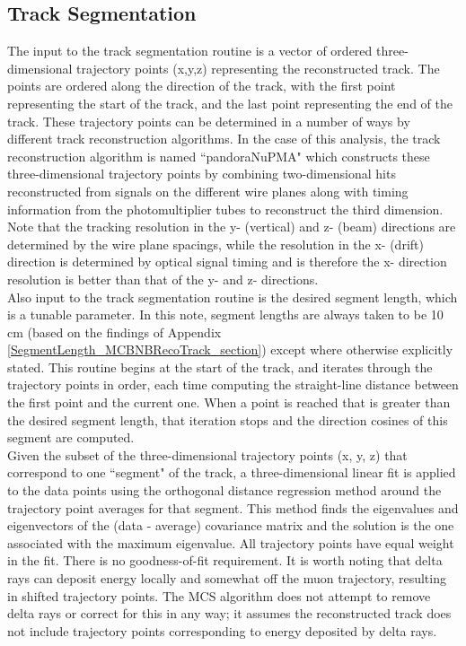 \subsection{Track Segmentation}\label{track_segmentation_section}
The input to the track segmentation routine is a vector of ordered three-dimensional trajectory points (x,y,z) representing the reconstructed track. The points are ordered along the direction of the track, with the first point representing the start of the track, and the last point representing the end of the track. These trajectory points can be determined in a number of ways by different track reconstruction algorithms. In the case of this analysis, the track reconstruction algorithm is named ``pandoraNuPMA" which constructs these three-dimensional trajectory points by combining two-dimensional hits reconstructed from signals on the different wire planes along with timing information from the photomultiplier tubes to reconstruct the third dimension\cite{Marshall:2015rfa}. Note that the tracking resolution in the y- (vertical) and z- (beam) directions are determined by the wire plane spacings, while the resolution in the x- (drift) direction is determined by optical signal timing and is therefore the x- direction resolution is better than that of the y- and z- directions.\\

Also input to the track segmentation routine is the desired segment length, which is a tunable parameter. In this note, segment lengths are always taken to be 10 cm (based on the findings of Appendix \ref{SegmentLength_MCBNBRecoTrack_section}) except where otherwise explicitly stated. This routine begins at the start of the track, and iterates through the trajectory points in order, each time computing the straight-line distance between the first point and the current one. When a point is reached that is greater than the desired segment length, that iteration stops and the direction cosines of this segment are computed.\\

Given the subset of the three-dimensional trajectory points (x, y, z) that correspond to one ``segment" of the track, a three-dimensional linear fit is applied to the data points using the orthogonal distance regression method around the trajectory point averages for that segment. This method finds the eigenvalues and eigenvectors of the (data - average) covariance matrix and the solution is the one associated with the maximum eigenvalue. All trajectory points have equal weight in the fit. There is no goodness-of-fit requirement. It is worth noting that delta rays can deposit energy locally and somewhat off the muon trajectory, resulting in shifted trajectory points. The MCS algorithm does not attempt to remove delta rays or correct for this in any way; it assumes the reconstructed track does not include trajectory points corresponding to energy deposited by delta rays. \\

